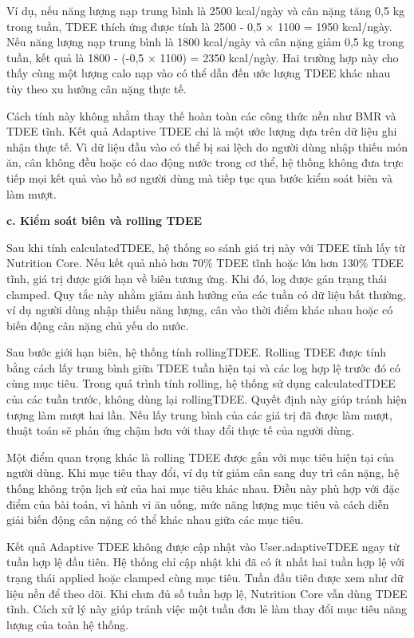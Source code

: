 Ví dụ, nếu năng lượng nạp trung bình là 2500 kcal/ngày và cân nặng tăng 0,5 kg trong tuần, TDEE thích ứng được tính là 2500 - 0,5 × 1100 = 1950 kcal/ngày. Nếu năng lượng nạp trung bình là 1800 kcal/ngày và cân nặng giảm 0,5 kg trong tuần, kết quả là 1800 - (-0,5 × 1100) = 2350 kcal/ngày. Hai trường hợp này cho thấy cùng một lượng calo nạp vào có thể dẫn đến ước lượng TDEE khác nhau tùy theo xu hướng cân nặng thực tế.

Cách tính này không nhằm thay thế hoàn toàn các công thức nền như BMR và TDEE tĩnh. Kết quả Adaptive TDEE chỉ là một ước lượng dựa trên dữ liệu ghi nhận thực tế. Vì dữ liệu đầu vào có thể bị sai lệch do người dùng nhập thiếu món ăn, cân không đều hoặc có dao động nước trong cơ thể, hệ thống không đưa trực tiếp mọi kết quả vào hồ sơ người dùng mà tiếp tục qua bước kiểm soát biên và làm mượt.

\textbf{c. Kiểm soát biên và rolling TDEE}

Sau khi tính calculatedTDEE, hệ thống so sánh giá trị này với TDEE tĩnh lấy từ Nutrition Core. Nếu kết quả nhỏ hơn 70\% TDEE tĩnh hoặc lớn hơn 130\% TDEE tĩnh, giá trị được giới hạn về biên tương ứng. Khi đó, log được gán trạng thái clamped. Quy tắc này nhằm giảm ảnh hưởng của các tuần có dữ liệu bất thường, ví dụ người dùng nhập thiếu năng lượng, cân vào thời điểm khác nhau hoặc có biến động cân nặng chủ yếu do nước.

Sau bước giới hạn biên, hệ thống tính rollingTDEE. Rolling TDEE được tính bằng cách lấy trung bình giữa TDEE tuần hiện tại và các log hợp lệ trước đó có cùng mục tiêu. Trong quá trình tính rolling, hệ thống sử dụng calculatedTDEE của các tuần trước, không dùng lại rollingTDEE. Quyết định này giúp tránh hiện tượng làm mượt hai lần. Nếu lấy trung bình của các giá trị đã được làm mượt, thuật toán sẽ phản ứng chậm hơn với thay đổi thực tế của người dùng.

Một điểm quan trọng khác là rolling TDEE được gắn với mục tiêu hiện tại của người dùng. Khi mục tiêu thay đổi, ví dụ từ giảm cân sang duy trì cân nặng, hệ thống không trộn lịch sử của hai mục tiêu khác nhau. Điều này phù hợp với đặc điểm của bài toán, vì hành vi ăn uống, mức năng lượng mục tiêu và cách diễn giải biến động cân nặng có thể khác nhau giữa các mục tiêu.

Kết quả Adaptive TDEE không được cập nhật vào User.adaptiveTDEE ngay từ tuần hợp lệ đầu tiên. Hệ thống chỉ cập nhật khi đã có ít nhất hai tuần hợp lệ với trạng thái applied hoặc clamped cùng mục tiêu. Tuần đầu tiên được xem như dữ liệu nền để theo dõi. Khi chưa đủ số tuần hợp lệ, Nutrition Core vẫn dùng TDEE tĩnh. Cách xử lý này giúp tránh việc một tuần đơn lẻ làm thay đổi mục tiêu năng lượng của toàn hệ thống.

